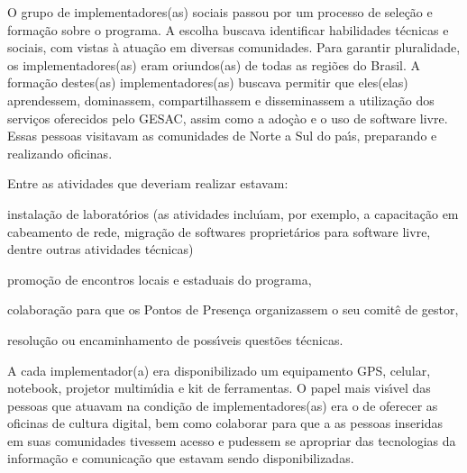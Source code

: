 \documentclass[
12pt,		%
openright,	%
twoside,  %
a4paper,			%
chapter=TITLE,		%
english,			%
french,				%
spanish,			%
brazil				%
]{USPSC-classe/USPSC}
\begin{document}
O grupo de implementadores(as) sociais passou por um processo de sele\c{c}\~ao e forma\c{c}\~ao sobre o programa. A escolha buscava identificar habilidades t\'ecnicas e sociais, com vistas \`a atua\c{c}\~ao em diversas comunidades. Para garantir pluralidade, os implementadores(as) eram oriundos(as) de todas as regi\~oes do Brasil. A forma\c{c}\~ao destes(as) implementadores(as) buscava  permitir que eles(elas) aprendessem, dominassem, compartilhassem  e disseminassem a utiliza\c{c}\~ao dos servi\c{c}os oferecidos pelo GESAC, assim como a ado\c{c}\`ao e o uso de software livre. Essas pessoas visitavam as comunidades de Norte a Sul do pa\'{\i}s, preparando e realizando oficinas.

















Entre as atividades que deveriam realizar estavam:


















\begin{alineas}
\item instala\c{c}\~ao de laborat\'orios (as atividades inclu\'{\i}am, por exemplo, a capacita\c{c}\~ao em cabeamento de rede, migra\c{c}\~ao de softwares propriet\'arios para software livre, dentre outras atividades t\'ecnicas)
\item promo\c{c}\~ao de encontros locais e estaduais do programa,
\item colabora\c{c}\~ao para que os  Pontos de Presen\c{c}a organizassem o seu comit\^e de gestor,
\item resolu\c{c}\~ao ou encaminhamento de poss\'{\i}veis quest\~oes t\'ecnicas.
\end{alineas}

A cada implementador(a) era disponibilizado um equipamento GPS, celular, notebook, projetor multim\'{\i}dia e kit de ferramentas. O papel mais vis\'{\i}vel das pessoas que atuavam na condi\c{c}\~ao de implementadores(as) era o de oferecer as oficinas de cultura digital, bem como colaborar para que a as pessoas inseridas em suas comunidades tivessem acesso e pudessem se apropriar das tecnologias da informa\c{c}\~ao e comunica\c{c}\~ao que estavam sendo disponibilizadas.
\end{document}
